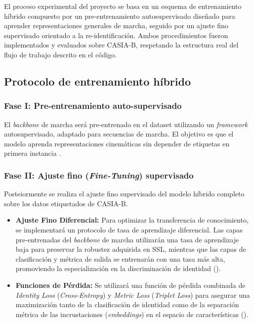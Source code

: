 El proceso experimental del proyecto se basa en un esquema de entrenamiento híbrido compuesto por  un pre-entrenamiento autosupervisado diseñado para aprender representaciones generales de marcha, seguido por un ajuste fino supervisado orientado a la re-identificación. Ambos procedimientos fueron implementados y evaluados sobre CASIA-B, respetando la estructura real del flujo de trabajo descrito en el código.

\subsection{Protocolo de entrenamiento híbrido}

\subsubsection{Fase I: Pre-entrenamiento auto-supervisado}
El \textit{backbone} de marcha será pre-entrenado en el dataset utilizando un \textit{framework} autosupervisado, adaptado para secuencias de marcha. El objetivo es que el modelo aprenda representaciones cinemáticas sin depender de etiquetas en primera instancia \cite{Huang2025PersonViT, Zheng2022PASS}.

\subsubsection{Fase II: Ajuste fino (\textit{Fine-Tuning}) supervisado}
Posteiormente se realiza el ajuste fino supervisado del modelo híbrido completo sobre los datos etiquetados de CASIA-B.

\begin{itemize}
    \item \textbf{Ajuste Fino Diferencial:} Para optimizar la transferencia de conocimiento, se implementará un protocolo de tasa de aprendizaje diferencial. Las capas pre-entrenadas del \textit{backbone} de marcha utilizarán una tasa de aprendizaje baja para preservar la robustez adquirida en SSL, mientras que las capas de clasificación y métrica de salida se entrenarán con una tasa más alta, promoviendo la especialización en la discriminación de identidad (\cite{Zheng2022PASS}).
    \item \textbf{Funciones de Pérdida:} Se utilizará una función de pérdida combinada de \textit{Identity Loss} (\textit{Cross-Entropy}) y \textit{Metric Loss} (\textit{Triplet Loss}) para asegurar una maximización tanto de la clasificación de identidad como de la separación métrica de las incrustaciones (\textit{embeddings}) en el espacio de características (\cite{Purish2023GaitRecognition}).
\end{itemize}


